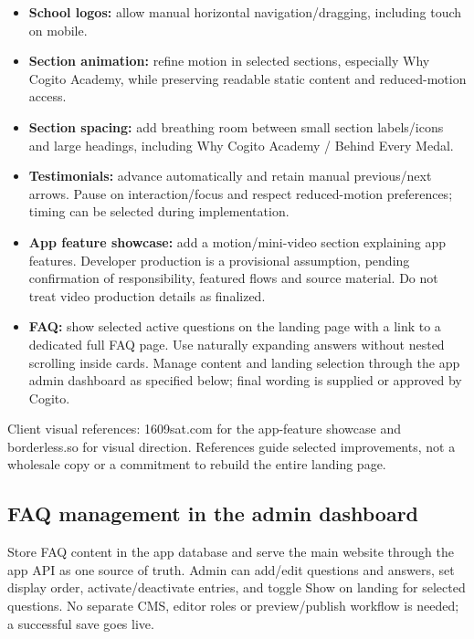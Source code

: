 \documentclass[11pt,a4paper]{article}
\begin{document}
\begin{itemize}
\item \textbf{School logos:} allow manual horizontal navigation/\allowbreak{}dragging, including touch on mobile.
\item \textbf{Section animation:} refine motion in selected sections, especially Why Cogito Academy, while preserving readable static content and reduced-motion access.
\item \textbf{Section spacing:} add breathing room between small section labels/\allowbreak{}icons and large headings, including Why Cogito Academy /\allowbreak{} Behind Every Medal.
\item \textbf{Testimonials:} advance automatically and retain manual previous/\allowbreak{}next arrows. Pause on interaction/\allowbreak{}focus and respect reduced-motion preferences; timing can be selected during implementation.
\item \textbf{App feature showcase:} add a motion/\allowbreak{}mini-video section explaining app features. Developer production is a provisional assumption, pending confirmation of responsibility, featured flows and source material. Do not treat video production details as finalized.
\item \textbf{FAQ:} show selected active questions on the landing page with a link to a dedicated full FAQ page. Use naturally expanding answers without nested scrolling inside cards. Manage content and landing selection through the app admin dashboard as specified below; final wording is supplied or approved by Cogito.
\end{itemize}

Client visual references: 1609sat.com for the app-feature showcase and borderless.so for visual direction. References guide selected improvements, not a wholesale copy or a commitment to rebuild the entire landing page.

\subsection*{FAQ management in the admin dashboard}

Store FAQ content in the app database and serve the main website through the app API as one source of truth. Admin can add/\allowbreak{}edit questions and answers, set display order, activate/\allowbreak{}deactivate entries, and toggle Show on landing for selected questions. No separate CMS, editor roles or preview/\allowbreak{}publish workflow is needed; a successful save goes live.
\end{document}
